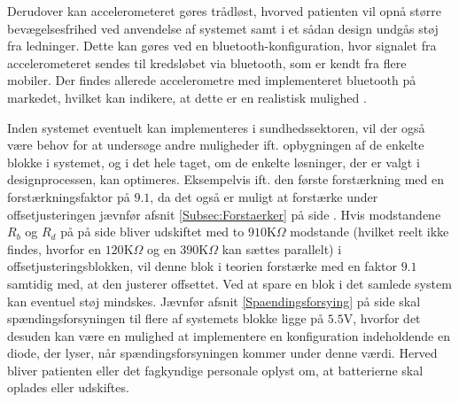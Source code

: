 Derudover kan accelerometeret gøres trådløst, hvorved patienten vil opnå større bevægelsesfrihed ved anvendelse af systemet samt i et sådan design undgås støj fra ledninger. Dette kan gøres ved en bluetooth-konfiguration, hvor signalet fra accelerometeret sendes til kredsløbet via bluetooth, som er kendt fra flere mobiler. Der findes allerede accelerometre med implementeret bluetooth på markedet, hvilket kan indikere, at dette er en realistisk mulighed \cite{Axivity2015, Bioradio2015}. 

Inden systemet eventuelt kan implementeres i sundhedssektoren, vil der også være behov for at undersøge andre muligheder ift. opbygningen af de enkelte blokke i systemet, og i det hele taget, om de enkelte løsninger, der er valgt i designprocessen, kan optimeres. Eksempelvis ift. den første forstærkning med en forstærkningsfaktor på $9.1$, da det også er muligt at forstærke under offsetjusteringen jævnfør afsnit \ref{Subsec:Forstaerker} på side \pageref{Subsec:Forstaerker}. Hvis modstandene $R_{b}$ og $R_{d}$ på  på side \pageref{fig:Forstaerker_faktor18} bliver udskiftet med to $910$K$\Omega$ modstande (hvilket reelt ikke findes, hvorfor en $120$K$\Omega$ og en $390$K$\Omega$ kan sættes parallelt) i offsetjusteringsblokken, vil denne blok i teorien forstærke med en faktor $9.1$ samtidig med, at den justerer offsettet. Ved at spare en blok i det samlede system kan eventuel støj mindskes. Jævnfør afsnit \ref{Spaendingsforsying} på side \pageref{Spaendingsforsying} skal spændingsforsyningen til flere af systemets blokke ligge på $5.5$V, hvorfor det desuden kan være en mulighed at implementere en konfiguration indeholdende en diode, der lyser, når spændingsforsyningen kommer under denne værdi. Herved bliver patienten eller det fagkyndige personale oplyst om, at batterierne skal oplades eller udskiftes.

